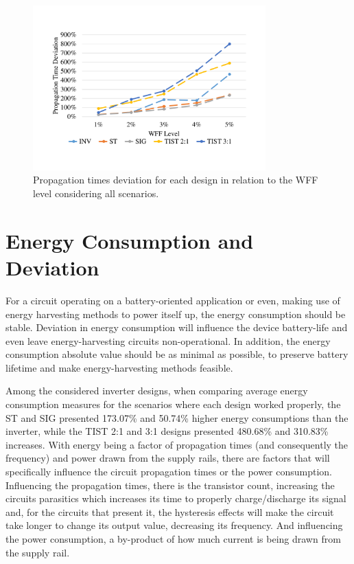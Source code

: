\documentclass[diss,pgmicro,english]{iiufrgs}
\begin{document}
\begin{figure}[h]
	\centering
		\includegraphics[width=0.8\textwidth, trim={2cm 3cm 2cm 3cm}, clip]{delayDevWFF.pdf}
		\caption{Propagation times deviation for each design in relation to the WFF level considering all scenarios.}
	\label{fig:delaysDev}
\end{figure}

\section{Energy Consumption and Deviation}

For a circuit operating on a battery-oriented application or even, making use of energy harvesting methods to power itself up, the energy consumption should be stable. Deviation in energy consumption will influence the device battery-life and even leave energy-harvesting circuits non-operational. In addition, the energy consumption absolute value should be as minimal as possible, to preserve battery lifetime and make energy-harvesting methods feasible.

Among the considered inverter designs, when comparing average energy consumption measures for the scenarios where each design worked properly, the ST and SIG presented 173.07\% and 50.74\% higher energy consumptions than the inverter, while the TIST 2:1 and 3:1 designs presented 480.68\% and 310.83\% increases. With energy being a factor of propagation times (and consequently the frequency) and power drawn from the supply rails, there are factors that will specifically influence the circuit propagation times or the power consumption. Influencing the propagation times, there is the transistor count, increasing the circuits parasitics which increases its time to properly charge/discharge its signal and, for the circuits that present it, the hysteresis effects will make the circuit take longer to change its output value, decreasing its frequency. And influencing the power consumption, a by-product of how much current is being drawn from the supply rail.
\end{document}
